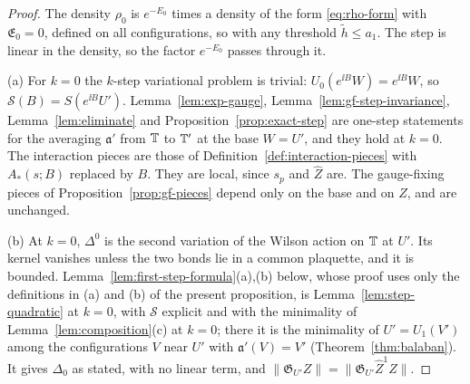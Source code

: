 \begin{proof}
The density $\rho_0$ is $e^{-E_0}$ times a density of the form \eqref{eq:rho-form} with $\mathfrak E_0=0$, defined on all configurations, so with any threshold $\tilde h\le a_1$. The step is linear in the density, so the factor $e^{-E_0}$ passes through it.

(a) For $k=0$ the $k$-step variational problem is trivial: $U_0(e^{\ii B}W)=e^{\ii B}W$, so $\mathcal S(B)=S(e^{\ii B}U')$. Lemma~\ref{lem:exp-gauge}, Lemma~\ref{lem:gf-step-invariance}, Lemma~\ref{lem:eliminate} and Proposition~\ref{prop:exact-step} are one-step statements for the averaging $\mathfrak a'$ from $\mathbb T$ to $\mathbb T'$ at the base $W=U'$, and they hold at $k=0$. The interaction pieces are those of Definition~\ref{def:interaction-pieces} with $A_*(s;B)$ replaced by $B$. They are local, since $s_p$ and $\hat Z$ are. The gauge-fixing pieces of Proposition~\ref{prop:gf-pieces} depend only on the base and on $Z$, and are unchanged.

(b) At $k=0$, $\Delta^0$ is the second variation of the Wilson action on $\mathbb T$ at $U'$. Its kernel vanishes unless the two bonds lie in a common plaquette, and it is bounded. Lemma~\ref{lem:first-step-formula}(a),(b) below, whose proof uses only the definitions in (a) and (b) of the present proposition, is Lemma~\ref{lem:step-quadratic} at $k=0$, with $\mathcal S$ explicit and with the minimality of Lemma~\ref{lem:composition}(c) at $k=0$; there it is the minimality of $U'=U_1(V')$ among the configurations $V$ near $U'$ with $\mathfrak a'(V)=V'$ (Theorem~\ref{thm:balaban}). It gives $\Delta_0$ as stated, with no linear term, and $\|\mathfrak G_{U'}Z\|=\|\mathfrak G_{U'}\hat Z^1Z\|$.


\end{proof}
